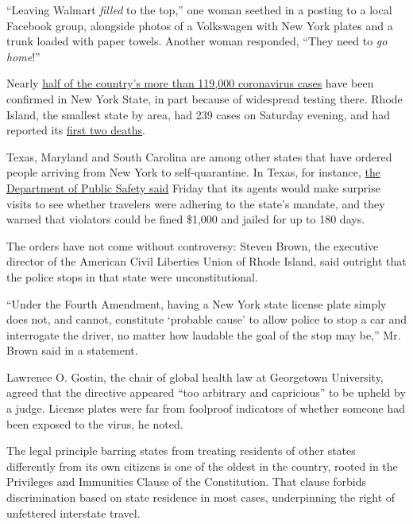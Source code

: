 ``Leaving Walmart \emph{filled} to the top,'' one woman seethed in a
posting to a local Facebook group, alongside photos of a Volkswagen with
New York plates and a trunk loaded with paper towels. Another woman
responded, ``They need to \emph{go home}!''

Nearly
\href{https://www.nytimes3xbfgragh.onion/interactive/2020/us/coronavirus-us-cases.html}{half
of the country's more than 119,000 coronavirus cases} have been
confirmed in New York State, in part because of widespread testing
there. Rhode Island, the smallest state by area, had 239 cases on
Saturday evening, and had reported its
\href{https://www.providencejournal.com/news/20200328/with-first-2-ri-coronavirus-deaths-raimondo-issues-stay-at-home-order-closes-non-essential-retail}{first
two deaths}.

Texas, Maryland and South Carolina are among other states that have
ordered people arriving from New York to self-quarantine. In Texas, for
instance,
\href{https://www.dps.texas.gov/director_staff/media_and_communications/pr/2020/0327a}{the
Department of Public Safety said} Friday that its agents would make
surprise visits to see whether travelers were adhering to the state's
mandate, and they warned that violators could be fined \$1,000 and
jailed for up to 180 days.

The orders have not come without controversy: Steven Brown, the
executive director of the American Civil Liberties Union of Rhode
Island, said outright that the police stops in that state were
unconstitutional.

``Under the Fourth Amendment, having a New York state license plate
simply does not, and cannot, constitute `probable cause' to allow police
to stop a car and interrogate the driver, no matter how laudable the
goal of the stop may be,'' Mr. Brown said in a statement.

Lawrence O. Gostin, the chair of global health law at Georgetown
University, agreed that the directive appeared ``too arbitrary and
capricious'' to be upheld by a judge. License plates were far from
foolproof indicators of whether someone had been exposed to the virus,
he noted.

The legal principle barring states from treating residents of other
states differently from its own citizens is one of the oldest in the
country, rooted in the Privileges and Immunities Clause of the
Constitution. That clause forbids discrimination based on state
residence in most cases, underpinning the right of unfettered interstate
travel.

